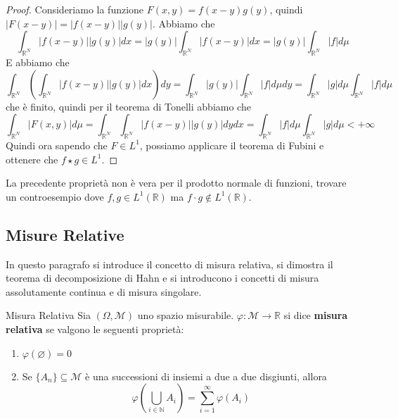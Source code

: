 \begin{proof}
    Consideriamo la funzione \(F(x, y) = f(x-y) g(y)\), quindi
    \(|F(x-y)| = |f(x-y)||g(y)|\). Abbiamo che
    \[
\int_{\mathbb{R}^{N}}
        |f(x-y)||g(y)| dx = |g(y)| \int_{\mathbb{R}^{N}} |f(x-y)| dx = |g(y)|
        \int_{\mathbb{R}^{N}} |f| d\mu
    \]
    E abbiamo che
    \[
        \int_{\mathbb{R}^{N}} {\left( \int_{\mathbb{R}^{N}} |f(x-y)| |g(y)| dx
        \right)} dy = \int_{\mathbb{R}^{N}} |g(y)| \int_{\mathbb{R}^{N}} |f|
        d\mu dy = \int_{\mathbb{R}^{N}} |g| d\mu \int_{\mathbb{R}^{N}} |f| d\mu
    \]
    che è finito, quindi per il teorema di Tonelli abbiamo che
    \[
        \int_{\mathbb{R}^{N}} |F(x, y)| d\mu =
         \int_{\mathbb{R}^{N}}
        \int_{\mathbb{R}^{N}} |f(x-y)||g(y)| dy dx =
        \int_{\mathbb{R}^{N}}|f|d\mu \int_{\mathbb{R}^{N}} |g|d\mu < +\infty    
    \]
    Quindi ora sapendo che \(F \in L^{1}\), possiamo applicare il teorema di
    Fubini e ottenere che \(f \star g \in L^{1}\).
\end{proof}
\begin{eser}
    La precedente proprietà non è vera per il prodotto normale di funzioni,
    trovare un controesempio dove \(f, g \in L^{1}(\mathbb{R})\) ma \(f \cdot g
    \not\in L^{1}(\mathbb{R})\).
\end{eser}

\newpage
\subsection{Misure Relative}
In questo paragrafo si introduce il concetto di misura relativa, si dimostra il
teorema di decomposizione di Hahn e si introducono i concetti di misura
assolutamente continua e di misura singolare.
\begin{definition}{Misura Relativa}
Sia \((\Omega, \mathcal{M})\) uno spazio misurabile. \(\varphi: \mathcal{M} \to
\mathbb{R}\) si dice \textbf{misura relativa} se valgono le seguenti proprietà:
\begin{enumerate}[label = \arabic*.]
    \item \(\varphi(\varnothing) = 0\)  
    \item Se \(\{A_{n}\} \subseteq\mathcal{M} \) è una successioni di insiemi a
        due a due disgiunti, allora
        \[
            \varphi\left( \bigcup_{i \in \mathbb{N}} A_{i} \right) =
            \sum_{i=1}^{\infty} \varphi(A_{i}) 
        \]
\end{enumerate}
\end{definition}

